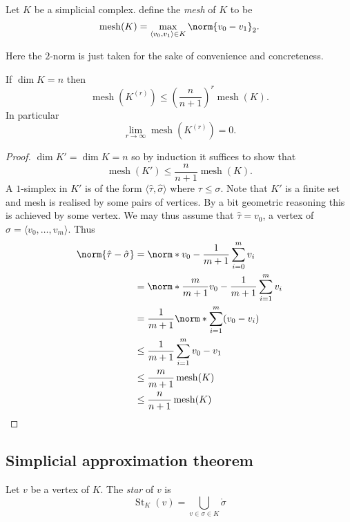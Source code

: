 \documentclass[a4paper]{article}
\newcommand{\interior}{\mathring} %
\DeclareMathOperator{\mesh}{mesh}
\DeclareMathOperator{\St}{St} %
\begin{document}
\begin{definition}[mesh]
  Let \(K\) be a simplicial complex. define the \emph{mesh} of \(K\) to be
  \[
    \mesh(K) = \max_{\langle v_0, v_1 \rangle \in K} \norm{v_0 - v_1}_2.
  \]
\end{definition}

Here the \(2\)-norm is just taken for the sake of convenience and concreteness.

\begin{lemma}
  If \(\dim K = n\) then
  \[
    \mesh(K^{(r)}) \leq \left(\frac{n}{n + 1}\right)^r \mesh(K).
  \]
  In particular
  \[
    \lim_{r \to \infty} \mesh(K^{(r)}) = 0.
  \]
\end{lemma}

\begin{proof}
  \(\dim K' = \dim K = n\) so by induction it suffices to show that
  \[
    \mesh(K') \leq \frac{n}{n + 1} \mesh(K).
  \]
  A \(1\)-simplex in \(K'\) is of the form \(\langle \hat \tau, \hat \sigma \rangle\) where \(\tau \leq \sigma\). Note that \(K'\) is a finite set and mesh is realised by some pairs of vertices. By a bit geometric reasoning this is achieved by some vertex. We may thus assume that \(\hat \tau = v_0\), a vertex of \(\sigma = \langle v_0, \dots, v_m\rangle\). Thus
  \begin{align*}
    \norm{\hat \tau - \hat \sigma}
    &= \norm*{v_0 - \frac{1}{m + 1} \sum_{i = 0}^m v_i} \\
    &= \norm*{\frac{m}{m + 1} v_0 - \frac{1}{m + 1} \sum_{i = 1}^m v_i} \\
    &= \frac{1}{m + 1} \norm*{\sum_{i = 1}^m (v_0 - v_i)} \\
    &\leq \frac{1}{m + 1} \sum_{i = 1}^m{v_0 - v_1} \\
    &\leq \frac{m}{m + 1} \mesh(K) \\
    &\leq \frac{n}{n + 1} \mesh (K)
  \end{align*}
\end{proof}

\subsection{Simplicial approximation theorem}

\begin{definition}[star]
  Let \(v\) be a vertex of \(K\). The \emph{star} of \(v\) is
  \[
    \St_K(v) = \bigcup_{v \in \sigma \in K} \interior \sigma
  \]
\end{definition}
\end{document}
